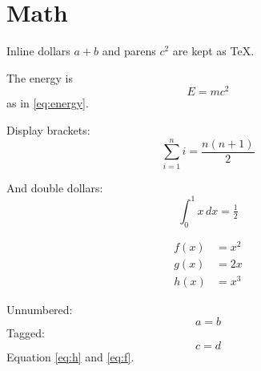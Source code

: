 
\section{Math}
Inline dollars $a+b$ and parens \(c^2\) are kept as TeX.

The energy is
\begin{equation}
E = mc^2 \label{eq:energy}
\end{equation}
as in \eqref{eq:energy}.

Display brackets:
\[
  \sum_{i=1}^n i = \frac{n(n+1)}{2}
\]

And double dollars:
$$\int_0^1 x\,dx = \tfrac12$$

\begin{align}
  f(x) &= x^2 \label{eq:f} \\
  g(x) &= 2x \nonumber \\
  h(x) &= x^3 \label{eq:h}
\end{align}

Unnumbered: \begin{equation*} a=b \end{equation*}
Tagged: \begin{equation} \tag{$\star$} c=d \end{equation}
Equation \ref{eq:h} and \eqref{eq:f}.

